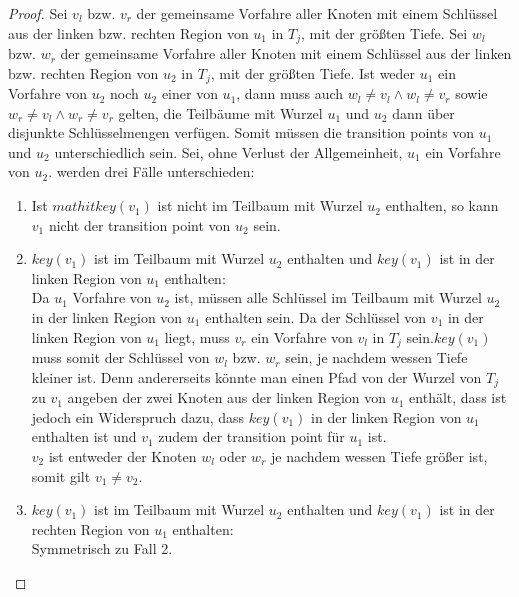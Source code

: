 \documentclass[a4paper,12pt]{article}
\begin{document}
\begin{proof}
 Sei $v_l$ bzw. $v_r$ der gemeinsame Vorfahre aller Knoten mit einem Schlüssel aus der linken bzw. rechten Region von $u_1$ in $T_j$, mit der größten Tiefe.  Sei $w_l$ bzw. $w_r$ der gemeinsame Vorfahre aller Knoten mit einem Schlüssel aus der linken bzw. rechten Region von $u_2$ in $T_j$, mit der größten Tiefe. Ist weder $u_1$ ein Vorfahre von $u_2$ noch $u_2$ einer von $u_1$, dann muss auch $w_l \ne v_l \land w_l \ne v_r$ sowie $w_r \ne v_l \land w_r \ne v_r$ gelten, die Teilbäume mit Wurzel $u_1$ und $u_2$ dann über disjunkte Schlüsselmengen verfügen. Somit müssen die transition points von $u_1$ und $u_2$ unterschiedlich sein. Sei, ohne Verlust der Allgemeinheit, $u_1$ ein Vorfahre von $u_2$. werden drei Fälle unterschieden:
 \begin{enumerate}
 	\item Ist $mathit{key}\left(v_1\right)$ ist nicht im Teilbaum mit Wurzel $u_2$ enthalten, so kann $v_1$ nicht der transition point von $u_2$ sein.
 	\item $\mathit{key}\left(v_1\right)$ ist im Teilbaum mit Wurzel $u_2$ enthalten und $\mathit{key}\left(v_1\right)$ ist  in der linken Region von $u_1$ enthalten:\\
 	 Da $u_1$ Vorfahre von $u_2$ ist, müssen alle Schlüssel im Teilbaum mit Wurzel $u_2$ in der linken Region von $u_1$ enthalten sein. Da der Schlüssel von $v_1$ in der linken Region von $u_1$ liegt, muss $v_r$ ein Vorfahre von $v_l$ in $T_j$ sein.$\mathit{key}\left(v_1\right)$ muss somit der Schlüssel von $w_l$ bzw. $w_r$ sein, je nachdem wessen Tiefe kleiner ist. Denn andererseits könnte man einen Pfad von der Wurzel von $T_j$ zu $v_1$ angeben der zwei Knoten aus der linken Region von $u_1$ enthält, dass ist jedoch ein Widerspruch dazu, dass  $\mathit{key}\left(v_1\right)$ in der linken Region von $u_1$ enthalten ist und $v_1$ zudem der transition point für $u_1$ ist.\\
 	$v_2$ ist entweder der Knoten $w_l$ oder $w_r$ je nachdem wessen Tiefe größer ist, somit gilt $v_1 \ne v_2$.
	\item $\mathit{key}\left(v_1\right)$ ist im Teilbaum mit Wurzel $u_2$ enthalten und $\mathit{key}\left(v_1\right)$ ist in der rechten Region von $u_1$ enthalten:\\
	Symmetrisch zu Fall 2.
 \end{enumerate}
 
 

  


\end{proof}
\end{document}
